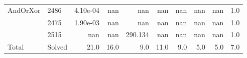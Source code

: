 \begin{tabular}{llrrrrrrrr}
\midrule
\multirow{3}{*}{AndOrXor}
&2486 & 4.10e-04 & nan & nan & nan & nan & nan & nan & 1.0 \\
&2475 & 1.90e-03 & nan & nan & nan & nan & nan & nan & 1.0 \\
&2515 & nan & nan & 290.134 & nan & nan & nan & nan & 1.0 \\
\midrule
\multirow{1}{*}{Total}
& Solved & 21.0 & 16.0 & 9.0 & 11.0 & 9.0 & 5.0 & 5.0 & 7.0 \\
\bottomrule
\end{tabular}
